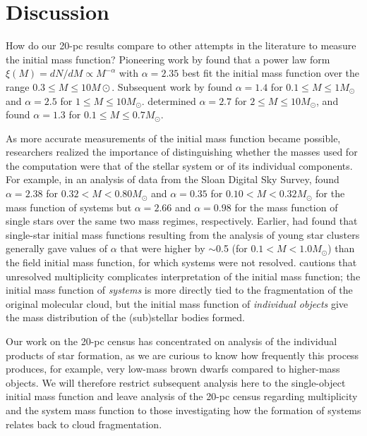 \documentclass[twocolumn,tighten,twocolappendix]{aastex631}
\begin{document}
\section{Discussion\label{sec:discussion}}

How do our 20-pc results compare to other attempts in the literature to measure the initial mass function? Pioneering work by \cite{salpeter1955} found that a power law form $\xi(M) = dN/dM \propto M^{-\alpha}$ with $\alpha = 2.35$ best fit the initial mass function over the range $0.3 \le M \le 10 M\odot$. Subsequent work by \cite{miller1979} found $\alpha = 1.4$ for $0.1 \le M \le 1 M_\odot$ and $\alpha = 2.5$ for $1 \le M \le 10 M_\odot$. \cite{scalo1986} determined $\alpha = 2.7$ for $2 \le M \le 10 M_\odot$, and \cite{reid2002} found $\alpha = 1.3$ for $0.1 \le M \le 0.7 M_\odot$. 

As more accurate measurements of the initial mass function became possible, researchers realized the importance of distinguishing whether the masses used for the computation were that of the stellar system or of its individual components. For example, in an analysis of data from the Sloan Digital Sky Survey, \cite{bochanski2010} found $\alpha = 2.38$ for $0.32 < M < 0.80 M_\odot$ and $\alpha = 0.35$ for $0.10 < M < 0.32 M_\odot$ for the mass function of systems but $\alpha = 2.66$ and $\alpha = 0.98$ for the mass function of single stars over the same two mass regimes, respectively. Earlier, \cite{kroupa2001} had found that single-star initial mass functions resulting from the analysis of young star clusters generally gave values of $\alpha$ that were higher by $\sim$0.5 (for $0.1 < M < 1.0 M_\odot$) than the field initial mass function, for which systems were not resolved. \cite{reid2005IMF} cautions that unresolved multiplicity complicates interpretation of the initial mass function; the initial mass function of {\it systems} is more directly tied to the fragmentation of the original molecular cloud, but the initial mass function of {\it individual objects} give the mass distribution of the (sub)stellar bodies formed.

Our work on the 20-pc census has concentrated on analysis of the individual products of star formation, as we are curious to know how frequently this process produces, for example, very low-mass brown dwarfs compared to higher-mass objects. We will therefore restrict subsequent analysis here to the single-object initial mass function and leave analysis of the 20-pc census regarding multiplicity and the system mass function to those investigating how the formation of systems relates back to cloud fragmentation. 
\end{document}
